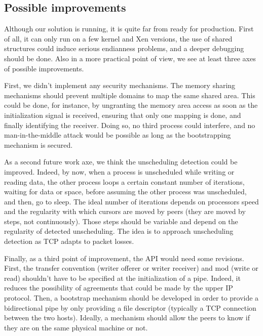 \documentclass[journal]{IEEEtran}
\begin{document}
\subsection{Possible improvements}

Although our solution is running, it is quite far from ready for production. First of all, it can only run on a few kernel and Xen versions, the use of shared structures could induce serious endianness problems, and a deeper debugging should be done. Also in a more practical point of view, we see at least three axes of possible improvements.

First, we didn't implement any security mechanisms. The memory sharing mechanisms should prevent multiple domains to map the same shared area. This could be done, for instance, by ungranting the memory area access as soon as the initialization signal is received, ensuring that only one mapping is done, and finally identifying the receiver. Doing so, no third process could interfere, and no man-in-the-middle attack would be possible as long as the bootstrapping mechanism is secured. 

As a second future work axe, we think the unscheduling detection could be improved. Indeed, by now, when a process is unscheduled while writing or reading data, the other process loops a certain constant number of iterations, waiting for data or space, before assuming the other process was unscheduled, and then, go to sleep. The ideal number of iterations depends on processors speed and the regularity with which cursors are moved by peers (they are moved by steps, not continuously). Those steps should be variable and depend on the regularity of detected unscheduling. The idea is to approach unscheduling detection as TCP adapts to packet losses. 

Finally, as a third point of improvement, the API would need some revisions. First, the transfer convention (writer offerer or writer receiver) and mod (write or read) shouldn't have to be specified at the initialization of a pipe. Indeed, it reduces the possibility of agreements that could be made by the upper IP protocol. Then, a bootstrap mechanism should be developed in order to provide a bidirectional pipe by only providing a file descriptor (typically a TCP connection between the two hosts). Ideally, a mechanism should allow the peers to know if they are on the same physical machine or not.
\end{document}
